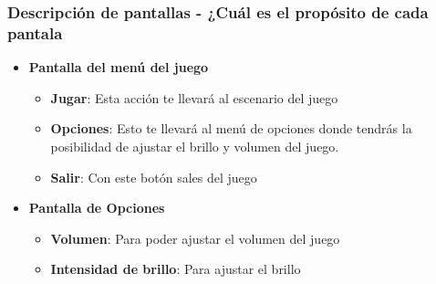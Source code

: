 \subsubsection{Descripción de pantallas - ¿Cuál es el propósito de cada pantala}
\begin{itemize}
  \item \textbf{Pantalla del menú del juego}
    \begin{itemize}
      \item \textbf{Jugar}: Esta acción te llevará al escenario del juego
      \item \textbf{Opciones}: Esto te llevará al menú de opciones donde tendrás
        la posibilidad de ajustar el brillo y volumen del juego.
      \item \textbf{Salir}: Con este botón sales del juego
    \end{itemize}
  \item \textbf{Pantalla de Opciones}
    \begin{itemize}
      \item \textbf{Volumen}: Para poder ajustar el volumen del juego
      \item \textbf{Intensidad de brillo}: Para ajustar el brillo
    \end{itemize}
\end{itemize}


